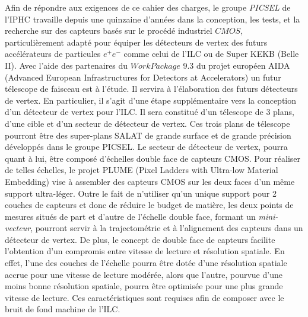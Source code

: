 \documentclass[a4paper,11pt]{report}
\begin{document}
\medskip

Afin de r\'epondre aux exigences de ce cahier des charges, le groupe \textit{PICSEL} de l'IPHC travaille depuis une quinzaine d'ann\'ees dans la conception, les tests, et la recherche sur des capteurs bas\'es sur le proc\'ed\'e industriel $CMOS$, particuli\`erement adapt\'e pour \'equiper les d\'etecteurs de vertex des futurs acc\'el\'erateurs de particules $e^+ e^-$ comme celui de l'ILC ou de Super KEKB (Belle II). Avec l'aide des partenaires du $WorkPackage$ 9.3 du projet europ\'een AIDA (Advanced European Infrastructures for Detectors at Accelerators) un futur t\'elescope de faisceau est \`a l'\'etude. Il servira \`a l'\'elaboration des futurs d\'etecteurs de vertex. En particulier, il s'agit d'une \'etape suppl\'ementaire vers la conception d'un d\'etecteur de vertex pour l'ILC. Il sera constitu\'e d'un t\'elescope de 3 plans, d'une cible et d'un secteur de d\'etecteur de vertex. Ces trois plans de t\'elescope pourront \^etre des super-plans SALAT de grande surface et de grande pr\'ecision d\'evelopp\'es dans le groupe PICSEL. Le secteur de d\'etecteur de vertex, pourra quant \`a lui, \^etre compos\'e d'\'echelles double face de capteurs CMOS. Pour r\'ealiser de telles \'echelles, le projet PLUME (Pixel Ladders with Ultra-low Material Embedding) vise \`a assembler des capteurs CMOS sur les deux faces d'un m\^eme support ultra-l\'eger. Outre le fait de n'utiliser qu'un unique support pour 2 couches de capteurs et donc de r\'eduire le budget de mati\`ere, les deux points de mesures situ\'es de part et d'autre de l'échelle double face, formant un \textit{mini-vecteur}, pourront servir \`a la trajectom\'etrie et \`a l'alignement des capteurs dans un d\'etecteur de vertex. De plus, le concept de double face de capteurs facilite l'obtention d'un compromis entre vitesse de lecture et r\'esolution spatiale. En effet, l'une des couches de l'\'echelle pourra \^etre dot\'ee d'une r\'esolution spatiale accrue pour une vitesse de lecture mod\'er\'ee, alors que l'autre, pourvue d'une moins bonne r\'esolution spatiale, pourra être optimis\'ee pour une plus grande vitesse de lecture. Ces caract\'eristiques sont requises afin de composer avec le bruit de fond machine de l'ILC.

\medskip
\end{document}
